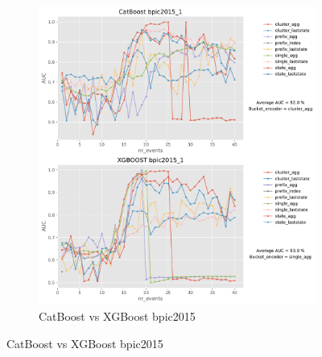 \begin{figure}[!htb]
\begin{subfigure}{0.48\textwidth}
		\includegraphics[width=\linewidth]{images/catboost/graphs/bpic2015_1_CatBoost_xgboost.pdf}
		\caption{CatBoost vs XGBoost bpic2015} \label{fig:b151}
	\end{subfigure}
	

\end{figure}
